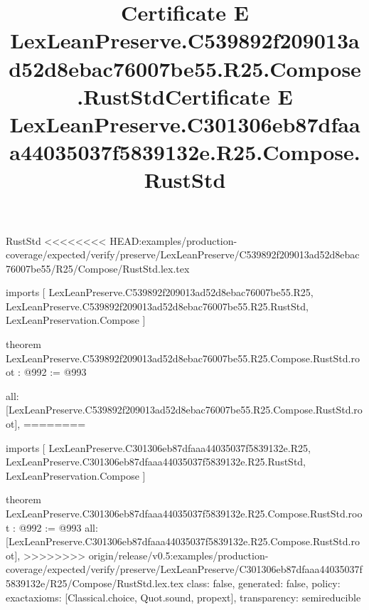 \begin{lexlean}{RustStd}
<<<<<<<< HEAD:examples/production-coverage/expected/verify/preserve/LexLeanPreserve/C539892f209013ad52d8ebac76007be55/R25/Compose/RustStd.lex.tex
\title{Certificate E LexLeanPreserve.C539892f209013ad52d8ebac76007be55.R25.Compose.RustStd}
\begin{coremodule}
imports [
  LexLeanPreserve.C539892f209013ad52d8ebac76007be55.R25,
  LexLeanPreserve.C539892f209013ad52d8ebac76007be55.R25.RustStd,
  LexLeanPreservation.Compose
]

theorem LexLeanPreserve.C539892f209013ad52d8ebac76007be55.R25.Compose.RustStd.root : @992 := @993 {
  all: [LexLeanPreserve.C539892f209013ad52d8ebac76007be55.R25.Compose.RustStd.root],
========
\title{Certificate E LexLeanPreserve.C301306eb87dfaaa44035037f5839132e.R25.Compose.RustStd}
\begin{coremodule}
imports [
  LexLeanPreserve.C301306eb87dfaaa44035037f5839132e.R25,
  LexLeanPreserve.C301306eb87dfaaa44035037f5839132e.R25.RustStd,
  LexLeanPreservation.Compose
]

theorem LexLeanPreserve.C301306eb87dfaaa44035037f5839132e.R25.Compose.RustStd.root : @992 := @993 {
  all: [LexLeanPreserve.C301306eb87dfaaa44035037f5839132e.R25.Compose.RustStd.root],
>>>>>>>> origin/release/v0.5:examples/production-coverage/expected/verify/preserve/LexLeanPreserve/C301306eb87dfaaa44035037f5839132e/R25/Compose/RustStd.lex.tex
  class: false,
  generated: false,
  policy: exact{axioms: [Classical.choice, Quot.sound, propext]},
  transparency: semireducible
}


\end{coremodule}}
\end{coremodule}
\end{lexlean}
